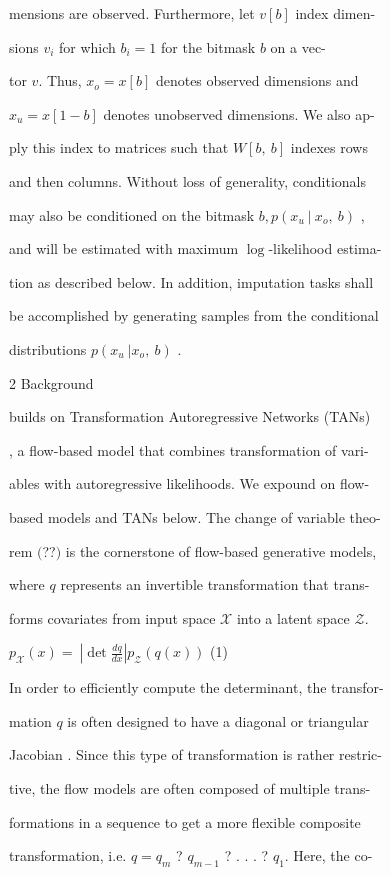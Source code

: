 \documentclass[a4paper,12pt]{article}
\begin{document}
mensions are observed. Furthermore, let $v[b]$ index dimen-

sions $v_{i}$ for which $b_{i} = 1$ for the bitmask $b$ on a vec-

tor $v$. Thus, $x_{o} = x[b]$ denotes observed dimensions and

$x_{u}=x[1-b]$ denotes unobserved dimensions. We also ap-

ply this index to matrices such that $W[b,\ b]$ indexes rows

and then columns. Without loss of generality, conditionals

may also be conditioned on the bitmask $b, p (x_{u}\ |\ x_{o},\ b)$ ,

and will be estimated with maximum $\log$-likelihood estima-

tion as described below. In addition, imputation tasks shall

be accomplished by generating samples from the conditional

distributions $p (x_{u}\ |x_{o},\ b)$ .

2 Background

builds on Transformation Autoregressive Networks (TANs)

, a flow-based model that combines transformation of vari-

ables with autoregressive likelihoods. We expound on flow-

based models and TANs below. The change of variable theo-

rem $($??$)$ is the cornerstone of flow-based generative models,

where $q$ represents an invertible transformation that trans-

forms covariates from input space $\mathcal{X}$ into a latent space $\mathcal{Z}.$
\begin{center}
$p_{\mathcal{X}}(x)=\displaystyle \ |\det\frac{dq}{dx}|p_{\mathcal{Z}}(q(x))$   (1)
\end{center}
In order to efficiently compute the determinant, the transfor-

mation $q$ is often designed to have a diagonal or triangular

Jacobian . Since this type of transformation is rather restric-

tive, the flow models are often composed of multiple trans-

formations in a sequence to get a more flexible composite

transformation, i.e. $q=q_{m}$ ? $q_{m-1}$ ? . . . ? $q_{1}$. Here, the co-
\end{document}

